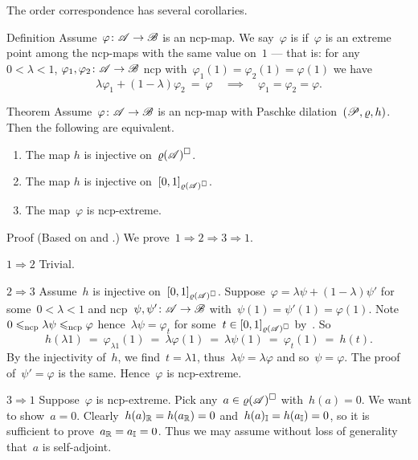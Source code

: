 \documentclass[b]{subfiles}
\begin{document}
\begin{parsec}%
\begin{point}%
The order correspondence 
    has several corollaries.
\end{point}
\begin{point}{Definition}%
Assume~$\varphi\colon \mathscr{A} \to \mathscr{B}$ is an ncp-map.
We say~$\varphi$ is 
    if~$\varphi$ is an extreme point among
    the ncp-maps with the same value on~$1$ ---
    that is:
    for any~$0 < \lambda < 1$, $\varphi_1,\varphi_2\colon \mathscr{A} \to \mathscr{B}$
    ncp with~$\varphi_1(1) = \varphi_2(1) = \varphi(1)$
    we have
    \begin{equation*}
    \lambda \varphi_1 + (1-\lambda)\varphi_2 \ =\  \varphi
    \quad \implies \quad
    \varphi_1=\varphi_2=\varphi.
    \end{equation*}
\end{point}
\begin{point}{Theorem}%
Assume~$\varphi\colon \mathscr{A} \to \mathscr{B}$ is an ncp-map
    with Paschke dilation~$(\mathscr{P}, \varrho, h)$.
Then the following are equivalent.
\begin{enumerate}
    \item The map $h$ is injective on~$\varrho(\mathscr{A})^\square$.
    \item The map $h$ is injective on~$[0,1]_{\varrho(\mathscr{A})^\square}$.
    \item The map~$\varphi$ is ncp-extreme.
\end{enumerate}
\begin{point}{Proof}%
(Based on \cite[Prop.~1.4.6]{arveson}
    and \cite[Thm.~5.4]{paschke}.)
We prove~$1 \Rightarrow 2 \Rightarrow 3 \Rightarrow 1$.
\begin{point}{$1 \Rightarrow 2$}%
Trivial.
\end{point}
\begin{point}{$2 \Rightarrow 3$}%
Assume~$h$ is injective on~$[0,1]_{\varrho(\mathscr{A})^\square}$.
Suppose~$\varphi = \lambda \psi + (1 - \lambda) \psi'$
    for some~$0 < \lambda < 1$
    and ncp~$\psi,\psi'\colon \mathscr{A} \to \mathscr{B}$
    with~$\psi(1) = \psi'(1) = \varphi(1)$.
Note~$0 \leqslant_{\mathrm{ncp}} \lambda\psi \leqslant_{\mathrm{ncp}} \varphi$
hence~$\lambda\psi = \varphi_t$ for some~$t \in [0,1]_{\varrho(\mathscr{A})^\square}$
by~.
So
\begin{equation*}
    h(\lambda 1)
    \ =\  \varphi_{\lambda1}(1) \ =\  \lambda \varphi(1) 
    \ =\  \lambda \psi(1)
    \ =\  \varphi_t (1)  \ =\  h(t).
\end{equation*}
By the injectivity of~$h$,
    we find~$t = \lambda 1$,
    thus~$\lambda \psi = \lambda \varphi$
    and so~$\psi = \varphi$.
The proof of~$\psi' = \varphi$ is the same.
Hence~$\varphi$ is ncp-extreme.
\end{point}
\begin{point}{$3 \Rightarrow 1$}%
Suppose~$\varphi$ is ncp-extreme.
Pick any~$a \in \varrho(\mathscr{A})^\square$ with~$h(a) = 0$.
We want to show~$a = 0$.
Clearly~$h(a)_{\mathbb{R}} = h(a_{\mathbb{R}}) = 0$
and~$h(a)_{\mathbb{I}} = h(a_{\mathbb{I}}) = 0$,
so it is sufficient to prove~$a_{\mathbb{R}} = a_{\mathbb{I}}=0$.
Thus we may assume without loss of generality that~$a$ is self-adjoint.


\end{point}
\end{point}
\end{point}
\end{parsec}
\end{document}
